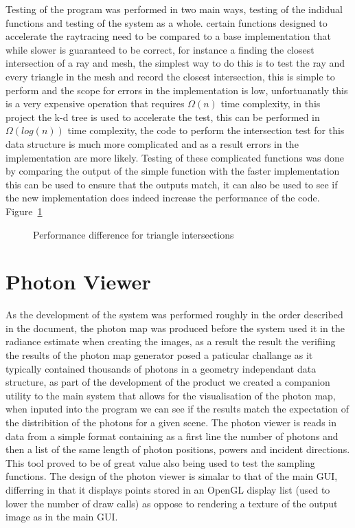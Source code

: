 Testing of the program was performed in two main ways, testing of the indidual functions and testing of the system as a whole.
certain functions designed to accelerate the raytracing need to be compared to a base implementation that while slower is
guaranteed to be correct, for instance a finding the closest intersection of a ray and mesh, the simplest way to do this
is to test the ray and every triangle in the mesh and record the closest intersection, this is simple to perform and
the scope for errors in the implementation is low, unfortuanatly this is a very expensive operation that requires $\Omega(n)$
time complexity, in this project the k-d tree is used to accelerate the test, this can be performed in $\Omega(log(n))$ time
complexity, the code to perform the intersection test for this data structure is much more complicated and as a result
errors in the implementation are more likely. Testing of these complicated functions was done by comparing the output
of the simple function with the faster implementation this can be used to ensure that the outputs match, it can also be
used to see if the new implementation does indeed increase the performance of the code. Figure~\ref{fig:testing_performance_comp}

\begin{figure}[h!]
\label{fig:testing_performance_comp}
\caption{Performance difference for triangle intersections}
\end{figure}

\section{Photon Viewer}
As the development of the system was performed roughly in the order described in the document, the photon map was produced before the
system used it in the radiance estimate when creating the images, as a result the result the verifiing the results of the photon
map generator posed a paticular challange as it typically contained thousands of photons in a geometry independant data structure, as
part of the development of the product we created a companion utility to the main system that allows for the visualisation of the
photon map, when inputed into the program we can see if the results match the expectation of the distribition of the photons for a
given scene. The photon viewer is reads in data from a simple format containing as a first line the number of photons and then
a list of the same length of photon positions, powers and incident directions. This tool proved to be of great value also being used
to test the sampling functions. The design of the photon viewer is simalar to that of the main GUI, differring in that it displays points
stored in an OpenGL display list  (used to lower the number of draw calls) as oppose to rendering a
texture of the output image as in the main GUI.

